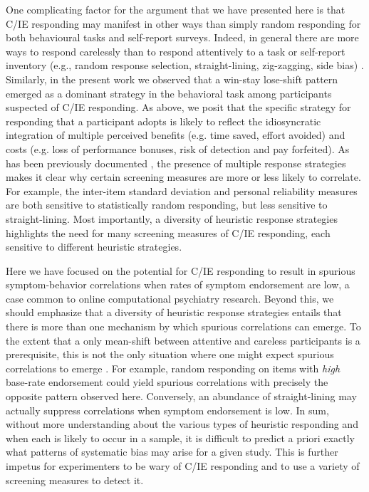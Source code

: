 \documentclass[a4paper,notitlepage,12pt]{article}
\begin{document}
One complicating factor for the argument that we have presented here is that C/IE responding may manifest in other ways than simply random responding for both behavioural tasks and self-report surveys. Indeed, in general there are more ways to respond carelessly than to respond attentively to a task or self-report inventory (e.g., random response selection, straight-lining, zig-zagging, side bias) \cite{curran2016methods}. Similarly, in the present work we observed that a win-stay lose-shift pattern emerged as a dominant strategy in the behavioral task among participants suspected of C/IE responding. As above, we posit that the specific strategy for responding that a participant adopts is likely to reflect the idiosyncratic integration of multiple perceived benefits (e.g. time saved, effort avoided) and costs (e.g. loss of performance bonuses, risk of detection and pay forfeited). As has been previously documented \cite{desimone2018dirty}, the presence of multiple response strategies makes it clear why certain screening measures are more or less likely to correlate. For example, the inter-item standard deviation and personal reliability measures are both sensitive to statistically random responding, but less sensitive to straight-lining. Most importantly, a diversity of heuristic response strategies highlights the need for many screening measures of C/IE responding, each sensitive to different heuristic strategies. 

Here we have focused on the potential for C/IE responding to result in spurious symptom-behavior correlations when rates of symptom endorsement are low, a case common to online computational psychiatry research. Beyond this, we should emphasize that a diversity of heuristic response strategies entails that there is more than one mechanism by which spurious correlations can emerge. To the extent that a only mean-shift between attentive and careless participants is a prerequisite, this is not the only situation where one might expect spurious correlations to emerge \cite{huang2015insufficient}. For example, random responding on items with \emph{high} base-rate endorsement could yield spurious correlations with precisely the opposite pattern observed here. Conversely, an abundance of straight-lining may actually suppress correlations when symptom endorsement is low. In sum, without more understanding about the various types of heuristic responding and when each is likely to occur in a sample, it is difficult to predict a priori exactly what patterns of systematic bias may arise for a given study. This is further impetus for experimenters to be wary of C/IE responding and to use a variety of screening measures to detect it. 
\end{document}
